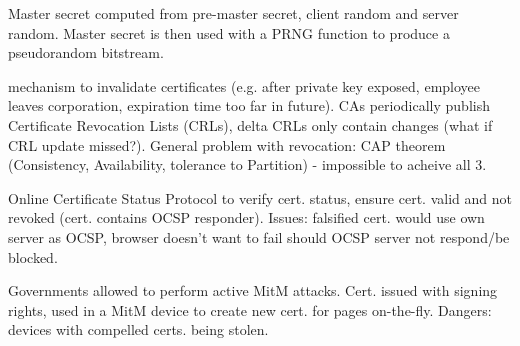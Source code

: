 

 Master secret computed from pre-master secret, client random and server random. Master secret is then used with a PRNG function to produce a pseudorandom bitstream.


 mechanism to invalidate certificates (e.g. after private key exposed, employee leaves corporation, expiration time too far in future). CAs periodically publish Certificate Revocation Lists (CRLs), delta CRLs only contain changes (what if CRL update missed?). General problem with revocation: CAP theorem (Consistency, Availability, tolerance to Partition) - impossible to acheive all 3.

 Online Certificate Status Protocol to verify cert. status, ensure cert. valid and not revoked (cert. contains OCSP responder). Issues: falsified cert. would use own server as OCSP, browser doesn't want to fail should OCSP server not respond/be blocked.

 Governments allowed to perform active MitM attacks. Cert. issued with signing rights, used in a MitM device to create new cert. for pages on-the-fly. Dangers: devices with compelled certs. being stolen.

